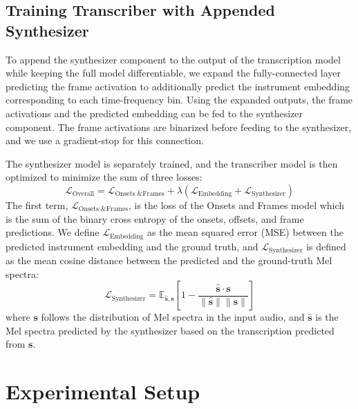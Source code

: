 \subsection{Training Transcriber with Appended Synthesizer}

To append the synthesizer component to the output of the transcription model while keeping the full model differentiable, we expand the fully-connected layer predicting the frame activation to additionally predict the instrument embedding corresponding to each time-frequency bin.
Using the expanded outputs, the frame activations and the predicted embedding can be fed to the synthesizer component.
The frame activations are binarized before feeding to the synthesizer, and we use a gradient-stop for this connection.

The synthesizer model is separately trained, and the transcriber model is then optimized to minimize the sum of three losses:
\begin{equation}\label{eqn:overall-loss}
\mathcal{L}_{\text{Overall}} = \mathcal{L}_{\text{Onsets \& Frames}} + \lambda \left ( \mathcal{L}_{\text{Embedding}} + \mathcal{L}_{\text{Synthesizer}} \right )
\end{equation}
The first term, $\mathcal{L}_{\text{Onsets \& Frames}}$, is the loss of the Onsets and Frames model which is the sum of the binary cross entropy of the onsets, offsets, and frame predictions.
We define $\mathcal{L}_{\text{Embedding}}$ as the mean squared error (MSE) between the predicted instrument embedding and the ground truth, and $\mathcal{L}_{\text{Synthesizer}}$ is defined as the mean cosine distance between the predicted and the ground-truth Mel spectra:
\begin{equation}\label{eqn:cosine-distance-loss}
\mathcal{L}_{\text{Synthesizer}} = \mathbb{E}_{\hat{\mathbf{s}}, \mathbf{s}} \left [ 1 - \frac{ \hat{\mathbf{s}} \cdot \mathbf{s} }{\lVert \hat{\mathbf{s}} \rVert \lVert \mathbf{s} \rVert} \right ]
\end{equation}
where $\mathbf{s}$ follows the distribution of Mel spectra in the input audio, and $\hat{\mathbf{s}}$ is the Mel spectra predicted by the synthesizer based on the transcription predicted from $\mathbf{s}$.

\section{Experimental Setup}

